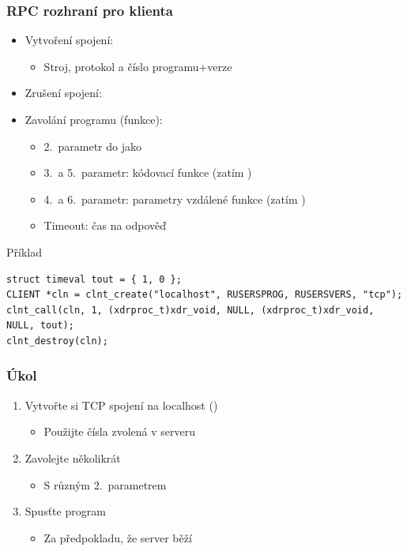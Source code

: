 \begin{frame}[fragile]
  \frametitle{RPC rozhraní pro klienta}

  \begin{itemize}
    \item Vytvoření spojení: 
    \begin{itemize}
      \item Stroj, protokol a číslo programu+verze
    \end{itemize}

    \item Zrušení spojení: 

    \pause
    
    \item Zavolání programu (funkce): 
    \begin{itemize}
      \item 2.\ parametr do  jako 
      \item 3.\ a 5.\ parametr: kódovací funkce (zatím )
      \item 4.\ a 6.\ parametr: parametry vzdálené funkce (zatím )
      \item Timeout: čas na odpověď
    \end{itemize}
  \end{itemize}

\begin{block}{Příklad}
\begin{lstlisting}
struct timeval tout = { 1, 0 };
CLIENT *cln = clnt_create("localhost", RUSERSPROG, RUSERSVERS, "tcp");
clnt_call(cln, 1, (xdrproc_t)xdr_void, NULL, (xdrproc_t)xdr_void, NULL, tout);
clnt_destroy(cln);
\end{lstlisting} %
\end{block}

\end{frame}

\begin{frame}
  \frametitle{Úkol}

  \begin{enumerate}
    \item Vytvořte si TCP spojení na localhost ()
    \begin{itemize}
      \item Použijte čísla zvolená v serveru
    \end{itemize}
    \item Zavolejte několikrát 
    \begin{itemize}
      \item S různým 2.\ parametrem
    \end{itemize}
    \item Spusťte program
    \begin{itemize}
      \item Za předpokladu, že server běží
    \end{itemize}
  \end{enumerate}

\end{frame}

